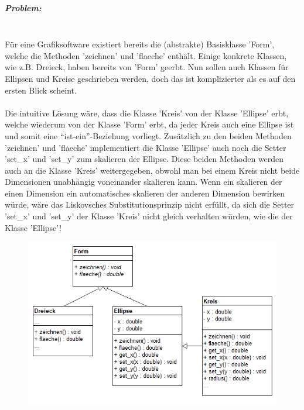 				\subparagraph*{Problem:}\mbox{}\\
					Für eine Grafiksoftware existiert bereits die (abstrakte) Basisklasse 'Form', welche die Methoden
					'zeichnen' und 'flaeche' enthält. Einige konkrete Klassen, wie z.B. Dreieck, haben bereits von 'Form'
					geerbt. Nun sollen auch Klassen für Ellipsen und Kreise geschrieben werden, doch das ist komplizierter
					als es auf den ersten Blick scheint.
					\\\\
					Die intuitive Lösung wäre, dass die Klasse 'Kreis' von der Klasse 'Ellipse' erbt, welche wiederum von
					der Klasse 'Form' erbt, da jeder Kreis auch eine Ellipse ist und somit eine ``ist-ein''-Beziehung
					vorliegt. Zusätzlich zu den beiden Methoden 'zeichnen' und 'flaeche' implementiert die Klasse 'Ellipse'
					auch noch die Setter 'set\_x' und 'set\_y' zum skalieren der Ellipse. Diese beiden Methoden werden auch
					an die Klasse 'Kreis' weitergegeben, obwohl man bei einem Kreis nicht beide Dimensionen unabhängig
					voneinander skalieren kann. Wenn ein skalieren der einen Dimension ein automatisches skalieren der anderen
					Dimension bewirken würde, wäre das Liskovsches Substitutionsprinzip nicht erfüllt, da sich die Setter
					'set\_x' und 'set\_y' der Klasse 'Kreis' nicht gleich verhalten würden, wie die der Klasse 'Ellipse'!
					
					\begin{figure}[H]
						\includegraphics[scale=0.6]{polymorphie/universell/vererbung/ellipse-kreis-problem/problem.png}
					\end{figure}
				
